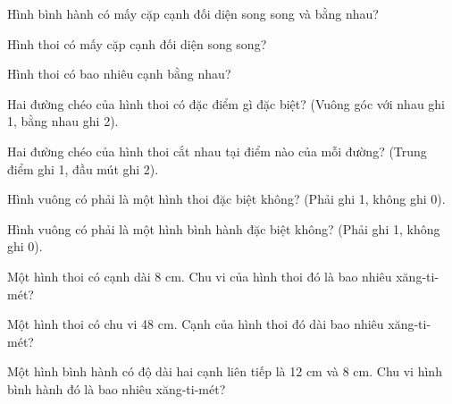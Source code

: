 \begin{ex}
Hình bình hành có mấy cặp cạnh đối diện song song và bằng nhau?
\end{ex}

\begin{ex}
Hình thoi có mấy cặp cạnh đối diện song song?
\end{ex}

\begin{ex}
Hình thoi có bao nhiêu cạnh bằng nhau?
\end{ex}

\begin{ex}
Hai đường chéo của hình thoi có đặc điểm gì đặc biệt? (Vuông góc với nhau ghi 1, bằng nhau ghi 2).
\end{ex}

\begin{ex}
Hai đường chéo của hình thoi cắt nhau tại điểm nào của mỗi đường? (Trung điểm ghi 1, đầu mút ghi 2).
\end{ex}

\begin{ex}
Hình vuông có phải là một hình thoi đặc biệt không? (Phải ghi 1, không ghi 0).
\end{ex}

\begin{ex}
Hình vuông có phải là một hình bình hành đặc biệt không? (Phải ghi 1, không ghi 0).
\end{ex}

\begin{ex}
Một hình thoi có cạnh dài 8 cm. Chu vi của hình thoi đó là bao nhiêu xăng-ti-mét?
\end{ex}

\begin{ex}
Một hình thoi có chu vi 48 cm. Cạnh của hình thoi đó dài bao nhiêu xăng-ti-mét?
\end{ex}

\begin{ex}
Một hình bình hành có độ dài hai cạnh liên tiếp là 12 cm và 8 cm. Chu vi hình bình hành đó là bao nhiêu xăng-ti-mét?
\end{ex}

